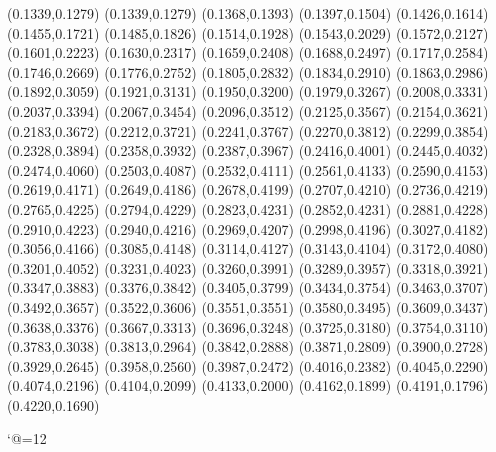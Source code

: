 \PST@Solid(0.1339,0.1279)
(0.1339,0.1279)
(0.1368,0.1393)
(0.1397,0.1504)
(0.1426,0.1614)
(0.1455,0.1721)
(0.1485,0.1826)
(0.1514,0.1928)
(0.1543,0.2029)
(0.1572,0.2127)
(0.1601,0.2223)
(0.1630,0.2317)
(0.1659,0.2408)
(0.1688,0.2497)
(0.1717,0.2584)
(0.1746,0.2669)
(0.1776,0.2752)
(0.1805,0.2832)
(0.1834,0.2910)
(0.1863,0.2986)
(0.1892,0.3059)
(0.1921,0.3131)
(0.1950,0.3200)
(0.1979,0.3267)
(0.2008,0.3331)
(0.2037,0.3394)
(0.2067,0.3454)
(0.2096,0.3512)
(0.2125,0.3567)
(0.2154,0.3621)
(0.2183,0.3672)
(0.2212,0.3721)
(0.2241,0.3767)
(0.2270,0.3812)
(0.2299,0.3854)
(0.2328,0.3894)
(0.2358,0.3932)
(0.2387,0.3967)
(0.2416,0.4001)
(0.2445,0.4032)
(0.2474,0.4060)
(0.2503,0.4087)
(0.2532,0.4111)
(0.2561,0.4133)
(0.2590,0.4153)
(0.2619,0.4171)
(0.2649,0.4186)
(0.2678,0.4199)
(0.2707,0.4210)
(0.2736,0.4219)
(0.2765,0.4225)
(0.2794,0.4229)
(0.2823,0.4231)
(0.2852,0.4231)
(0.2881,0.4228)
(0.2910,0.4223)
(0.2940,0.4216)
(0.2969,0.4207)
(0.2998,0.4196)
(0.3027,0.4182)
(0.3056,0.4166)
(0.3085,0.4148)
(0.3114,0.4127)
(0.3143,0.4104)
(0.3172,0.4080)
(0.3201,0.4052)
(0.3231,0.4023)
(0.3260,0.3991)
(0.3289,0.3957)
(0.3318,0.3921)
(0.3347,0.3883)
(0.3376,0.3842)
(0.3405,0.3799)
(0.3434,0.3754)
(0.3463,0.3707)
(0.3492,0.3657)
(0.3522,0.3606)
(0.3551,0.3551)
(0.3580,0.3495)
(0.3609,0.3437)
(0.3638,0.3376)
(0.3667,0.3313)
(0.3696,0.3248)
(0.3725,0.3180)
(0.3754,0.3110)
(0.3783,0.3038)
(0.3813,0.2964)
(0.3842,0.2888)
(0.3871,0.2809)
(0.3900,0.2728)
(0.3929,0.2645)
(0.3958,0.2560)
(0.3987,0.2472)
(0.4016,0.2382)
(0.4045,0.2290)
(0.4074,0.2196)
(0.4104,0.2099)
(0.4133,0.2000)
(0.4162,0.1899)
(0.4191,0.1796)
(0.4220,0.1690)

\catcode`@=12
\fi
\endpspicture
